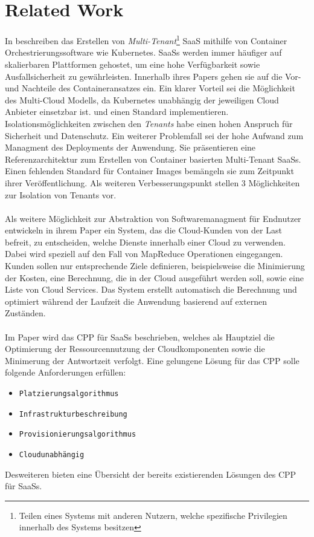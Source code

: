 \section{Related Work}
In \cite{Truyen2016} beschreiben \citeauthor{Truyen2016}
das Erstellen von \emph{Multi-Tenant}\footnote{Teilen eines Systems mit anderen Nutzern, welche spezifische Privilegien innerhalb des Systems besitzen}
\acf{SaaS} mithilfe von Container Orchestrierungssoftware wie Kubernetes.
\acp{SaaS} werden immer häufiger auf skalierbaren Plattformen gehostet, um eine hohe Verfügbarkeit sowie Ausfallsicherheit zu gewährleisten.
Innerhalb ihres Papers gehen sie auf die Vor- und Nachteile des Containeransatzes ein. 
Ein klarer Vorteil sei die Möglichkeit des Multi-Cloud Modells, da Kubernetes unabhängig der jeweiligen Cloud Anbieter einsetzbar ist.
und einen Standard implementieren.
Isolationsmöglichkeiten zwischen den \emph{Tenants} habe einen hohen Anspruch für Sicherheit und Datenschutz.
Ein weiterer Problemfall sei der hohe Aufwand zum Managment des Deployments der Anwendung.
Sie präsentieren eine Referenzarchitektur zum Erstellen von Container basierten Multi-Tenant SaaSs.
Einen fehlenden Standard für Container Images bemängeln sie zum Zeitpunkt ihrer Veröffentlichung.
Als weiteren Verbesserungspunkt stellen \citeauthor{Truyen2016} 3 Möglichkeiten zur Isolation von Tenants vor.

\paragraph{}
Als weitere Möglichkeit zur Abstraktion von Softwaremanagment für Endnutzer entwickeln \citeauthor{Wieder2012} in ihrem Paper
\cite{Wieder2012} ein System, das die Cloud-Kunden von der Last befreit, zu entscheiden, welche Dienste innerhalb einer Cloud zu verwenden.
Dabei wird speziell auf den Fall von MapReduce Operationen eingegangen. Kunden sollen nur entsprechende Ziele definieren, beispielsweise
die Minimierung der Kosten, eine Berechnung, die in der Cloud ausgeführt werden soll, sowie eine Liste von Cloud Services.
Das System erstellt automatisch die Berechnung und optimiert während der Laufzeit die Anwendung basierend auf externen Zuständen.

\paragraph{}
Im Paper \cite{Bousselmi2014} wird das \ac{CPP} für SaaSs beschrieben, welches als Hauptziel die Optimierung der Ressourcennutzung
der Cloudkomponenten sowie die Minimerung der Antwortzeit verfolgt.
Eine gelungene Lösung für das \ac{CPP} solle folgende Anforderungen erfüllen:
\begin{itemize}
  \item \texttt{Platzierungsalgorithmus}
  \item \texttt{Infrastrukturbeschreibung}
  \item \texttt{Provisionierungsalgorithmus}
  \item \texttt{Cloudunabhängig}
\end{itemize}
Desweiteren bieten \citeauthor{Bousselmi2015} eine Übersicht der bereits existierenden Lösungen des \ac{CPP} für \acp{SaaS}.